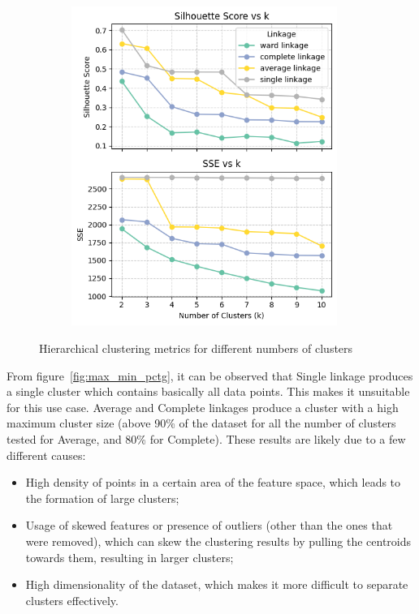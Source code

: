 \begin{figure}[H]
\begin{subfigure}[t]{0.49\textwidth}
        \includegraphics[width=0.95\textwidth]{plots/sil_sse_hierarchical_clust.png}
        \label{fig:sil_sse_hierarchical_clust}
    \end{subfigure}
    \caption{Hierarchical clustering metrics for different numbers of clusters}
    \label{fig:hier_clust_stats}
\end{figure}

From figure~\ref{fig:max_min_pctg}, it can be observed that Single linkage produces a single cluster which contains basically all data points. This makes it unsuitable for this use case.
Average and Complete linkages produce a cluster with a high maximum cluster size (above 90\% of the dataset for all the number of clusters tested for Average, and 80\% for Complete).
These results are likely due to a few different causes: 
\begin{itemize}
    \item High density of points in a certain area of the feature space, which leads to the formation of large clusters;
    \item Usage of skewed features or presence of outliers (other than the ones that were removed), which can skew the clustering results by pulling the centroids towards them, resulting in larger clusters;
    \item High dimensionality of the dataset, which makes it more difficult to separate clusters effectively.
\end{itemize}

